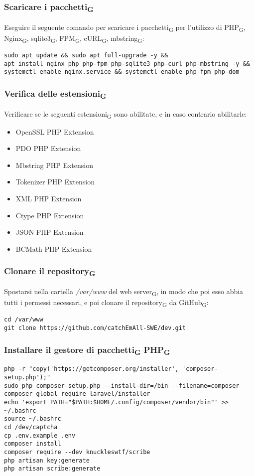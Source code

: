 \subsubsection{Scaricare i pacchetti\textsubscript{G}}
Eseguire il seguente comando per scaricare i pacchetti\textsubscript{G} per l'utilizzo di PHP\textsubscript{G}, Nginx\textsubscript{G}, sqlite3\textsubscript{G}, FPM\textsubscript{G}, cURL\textsubscript{G}, mbstring\textsubscript{G}:
\begin{verbatim}
sudo apt update && sudo apt full-upgrade -y && 
apt install nginx php php-fpm php-sqlite3 php-curl php-mbstring -y && 
systemctl enable nginx.service && systemctl enable php-fpm php-dom
\end{verbatim}

\subsubsection{Verifica delle estensioni\textsubscript{G}}
Verificare se le seguenti estensioni\textsubscript{G} sono abilitate, e in caso contrario abilitarle:
\begin{itemize}
	\item OpenSSL PHP Extension
	\item PDO PHP Extension
 \item Mbstring PHP Extension
 \item Tokenizer PHP Extension
 \item XML PHP Extension
 \item Ctype PHP Extension
 \item JSON PHP Extension
 \item BCMath PHP Extension 
\end{itemize}   

\subsubsection{Clonare il repository\textsubscript{G}}
Spostarsi nella cartella \textit{/var/www} del web server\textsubscript{G}, in modo che poi esso abbia tutti i permessi necessari, e poi clonare il repository\textsubscript{G} da GitHub\textsubscript{G}:
\begin{verbatim}
cd /var/www
git clone https://github.com/catchEmAll-SWE/dev.git
\end{verbatim}

\subsubsection{Installare il gestore di pacchetti\textsubscript{G} PHP\textsubscript{G}}
\begin{verbatim}
php -r "copy('https://getcomposer.org/installer', 'composer-setup.php');"
sudo php composer-setup.php --install-dir=/bin --filename=composer
composer global require laravel/installer
echo 'export PATH="$PATH:$HOME/.config/composer/vendor/bin"' >> ~/.bashrc
source ~/.bashrc
cd /dev/captcha
cp .env.example .env
composer install
composer require --dev knuckleswtf/scribe
php artisan key:generate
php artisan scribe:generate
\end{verbatim}

